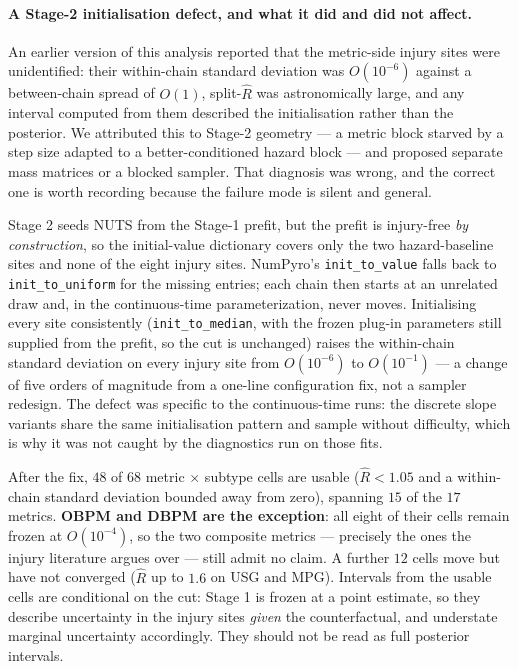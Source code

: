 \paragraph{A Stage-2 initialisation defect, and what it did and did not affect.}  An earlier version of this analysis reported that the metric-side injury sites were unidentified: their within-chain standard deviation was $O(10^{-6})$ against a between-chain spread of $O(1)$, split-$\hat{R}$ was astronomically large, and any interval computed from them described the initialisation rather than the posterior.  We attributed this to Stage-2 geometry --- a metric block starved by a step size adapted to a better-conditioned hazard block --- and proposed separate mass matrices or a blocked sampler.  That diagnosis was wrong, and the correct one is worth recording because the failure mode is silent and general.

Stage 2 seeds NUTS from the Stage-1 prefit, but the prefit is injury-free \emph{by construction}, so the initial-value dictionary covers only the two hazard-baseline sites and none of the eight injury sites.  NumPyro's \texttt{init\_to\_value} falls back to \texttt{init\_to\_uniform} for the missing entries; each chain then starts at an unrelated draw and, in the continuous-time parameterization, never moves.  Initialising every site consistently (\texttt{init\_to\_median}, with the frozen plug-in parameters still supplied from the prefit, so the cut is unchanged) raises the within-chain standard deviation on every injury site from $O(10^{-6})$ to $O(10^{-1})$ --- a change of five orders of magnitude from a one-line configuration fix, not a sampler redesign.  The defect was specific to the continuous-time runs: the discrete slope variants share the same initialisation pattern and sample without difficulty, which is why it was not caught by the diagnostics run on those fits.

After the fix, $48$ of $68$ metric $\times$ subtype cells are usable ($\hat{R} < 1.05$ and a within-chain standard deviation bounded away from zero), spanning $15$ of the $17$ metrics.  \textbf{OBPM and DBPM are the exception}: all eight of their cells remain frozen at $O(10^{-4})$, so the two composite metrics --- precisely the ones the injury literature argues over --- still admit no claim.  A further $12$ cells move but have not converged ($\hat{R}$ up to $1.6$ on USG and MPG).  Intervals from the usable cells are conditional on the cut: Stage 1 is frozen at a point estimate, so they describe uncertainty in the injury sites \emph{given} the counterfactual, and understate marginal uncertainty accordingly.  They should not be read as full posterior intervals.

